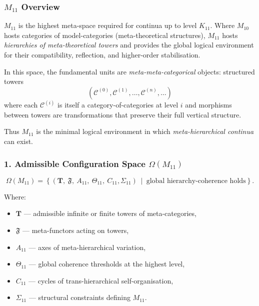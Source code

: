 

\subsubsection{$M_{11}$ Overview}
\label{sec:m11-overview}

$M_{11}$ is the highest meta-space required for continua up to level $K_{11}$.
Where $M_{10}$ hosts categories of model-categories (meta-theoretical structures),
$M_{11}$ hosts \emph{hierarchies of meta-theoretical towers} and provides
the global logical environment for their compatibility, reflection,
and higher-order stabilisation.

In this space, the fundamental units are \emph{meta-meta-categorical} objects:
structured towers
\[
(\mathcal{C}^{(0)}, \mathcal{C}^{(1)}, \ldots, \mathcal{C}^{(n)}, \ldots)
\]
where each $\mathcal{C}^{(i)}$ is itself a category-of-categories at level $i$
and morphisms between towers are transformations that preserve their full
vertical structure.

Thus $M_{11}$ is the minimal logical environment in which
\emph{meta-hierarchical continua} can exist.

\subsubsection*{1. Admissible Configuration Space $\Omega(M_{11})$}

\[
\Omega(M_{11}) =
\left\{
\left( \mathbf{T},\ \mathfrak{F},\ A_{11},\
\Theta_{11},\ C_{11},\Sigma_{11} \right)
\ \middle|\
\text{global hierarchy-coherence holds}
\right\}.
\]

Where:

\begin{itemize}
    \item $\mathbf{T}$ — admissible infinite or finite towers of meta-categories,
    \item $\mathfrak{F}$ — meta-functors acting on towers,
    \item $A_{11}$ — axes of meta-hierarchical variation,
    \item $\Theta_{11}$ — global coherence thresholds at the highest level,
    \item $C_{11}$ — cycles of trans-hierarchical self-organisation,
    \item $\Sigma_{11}$ — structural constraints defining $M_{11}$.
\end{itemize}

